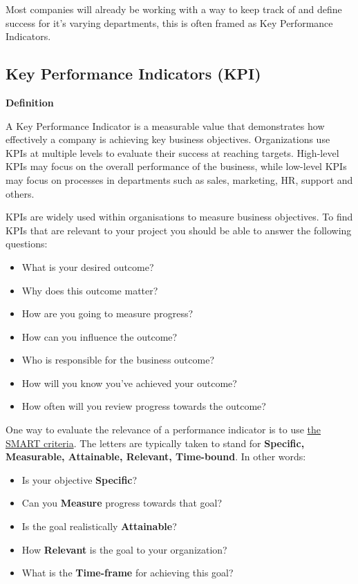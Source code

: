 \documentclass[]{book}
\providecommand{\tightlist}{%
  \setlength{\itemsep}{0pt}\setlength{\parskip}{0pt}}
\begin{document}
Most companies will already be working with a way to keep track of and
define success for it's varying departments, this is often framed as Key
Performance Indicators.

\hypertarget{KPIs}{%
\subsection{Key Performance Indicators (KPI)}\label{KPIs}}

\begin{infobox}

\textbf{Definition}

A Key Performance Indicator is a measurable value that demonstrates how
effectively a company is achieving key business objectives.
Organizations use KPIs at multiple levels to evaluate their success at
reaching targets. High-level KPIs may focus on the overall performance
of the business, while low-level KPIs may focus on processes in
departments such as sales, marketing, HR, support and others.

\end{infobox}

KPIs are widely used within organisations to measure business
objectives. To find KPIs that are relevant to your project you should be
able to answer the following questions:

\begin{itemize}
\tightlist
\item
  What is your desired outcome?
\item
  Why does this outcome matter?
\item
  How are you going to measure progress?
\item
  How can you influence the outcome?
\item
  Who is responsible for the business outcome?
\item
  How will you know you've achieved your outcome?
\item
  How often will you review progress towards the outcome?
\end{itemize}

One way to evaluate the relevance of a performance indicator is to use
\href{http://en.wikipedia.org/wiki/SMART_criteria}{the SMART criteria}.
The letters are typically taken to stand for \textbf{Specific,
Measurable, Attainable, Relevant, Time-bound}. In other words:

\begin{itemize}
\tightlist
\item
  Is your objective \textbf{Specific}?
\item
  Can you \textbf{Measure} progress towards that goal?
\item
  Is the goal realistically \textbf{Attainable}?
\item
  How \textbf{Relevant} is the goal to your organization?
\item
  What is the \textbf{Time-frame} for achieving this goal?
\end{itemize}
\end{document}
